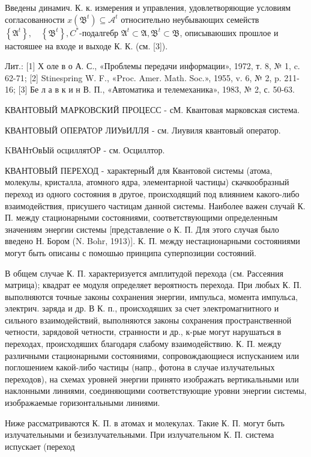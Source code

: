 \documentclass[10pt]{article}
\begin{document}
Введены динамич. К. к. измерения и управления, удовлетворяющие условиям согласованности $x\left(\mathfrak{B}^{t}\right) \subseteq \mathfrak{\mathcal { A }}^{t}$ относительно неубывающих семейств $\left\{\mathfrak{A}^{t}\right\}, \quad\left\{\mathfrak{B}^{t}\right\}, C^{*}$-подалгебр $\mathfrak{A}^{t} \subset \mathfrak{A}, \mathfrak{B}^{t} \subset \mathfrak{B}$, описываюших прошлое и настояшее на входе и выходе К. К. (см. [3]).



Лит.: [1] Х оле в о А. С., «Проблемы передачи информации», 1972, т. 8, № 1, c. 62-71; [2] Stinespring W. F., «Proc. Amer. Math. Soc.», 1955, v. 6, № 2, p. 211-16; [3] Бе л а в к и н В. П., «Автоматика и телемеханика», 1983, № 2, с. 50-63.



КВАНТОВЫЙ МАРКОВСКИЙ ПРОЦЕСС - сМ. Квантовая марковская система.



КВАНТОВЫЙ ОПЕРАТОР ЛИУвИЛЛЯ - см. Лиувиля квантовый оператор.



KВАНтОвЫй осциллятОР - см. Осциллтор.



КВАНТОВЫЙ ПЕРЕХОД - характерныЙ для Квантовой системы (атома, молекулы, кристалла, атомного ядра, элементарной частицы) скачкообразный переход из одного состояния в другое, происходящий под влиянием какого-либо взаимодействия, присушего частицам данной системы. Наиболее важен случай К. П. между стационарными состояниями, соответствующими определенным значениям энергии системы [представление о К. П. Для этого случая было введено Н. Бором (N. Bohr, 1913)]. К. П. между нестационарными состояниями могут быть описаны с помошью принципа суперпозиции состояний.



В общем случае К. П. характеризуется амплитудой перехода (см. Рассеяния матрица); квадрат ее модуля определяет вероятность перехода. При любых К. П. выполняются точные законы сохранения энергии, импульса, момента импульса, электрич. заряда и др. В К. п., происходяших за счет электромагнитного и сильного взаимодействий, выполняются законы сохранения пространственной четности, зарядовой четности, странности и др., к-рые могут нарушаться в переходах, происходяших благодаря слабому взаимодействию. К. П. между различными стационарными состояниями, сопровождающиеся испусканием или поглошением какой-либо частицы (напр., фотона в случае излучательных переходов), на схемах уровней энергии принято изображать вертикальными или наклонными линиями, соединяющими соответствующие уровни энергии системы, изображаемые горизонтальными линиями.



Ниже рассматриваются К. П. в атомах и молекулах. Такие К. П. могут быть излучательными и безизлучательными. При излучательном К. П. система испускает (переход
\end{document}
